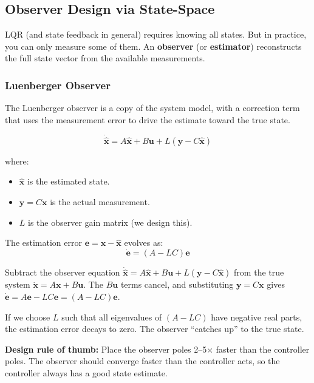 \subsection{Observer Design via State-Space}

LQR (and state feedback in general) requires knowing all states. But in practice, you can only measure some of them. An \textbf{observer} (or \textbf{estimator}) reconstructs the full state vector from the available measurements.

\subsubsection{Luenberger Observer}

The Luenberger observer is a copy of the system model, with a correction term that uses the measurement error to drive the estimate toward the true state.

\begin{equation}
\dot{\hat{\mathbf{x}}} = A\hat{\mathbf{x}} + B\mathbf{u} + L(\mathbf{y} - C\hat{\mathbf{x}})
\end{equation}

where:
\begin{itemize}[nosep]
    \item $\hat{\mathbf{x}}$ is the estimated state.
    \item $\mathbf{y} = C\mathbf{x}$ is the actual measurement.
    \item $L$ is the observer gain matrix (we design this).
\end{itemize}

The estimation error $\mathbf{e} = \mathbf{x} - \hat{\mathbf{x}}$ evolves as:
\begin{equation}
\dot{\mathbf{e}} = (A - LC)\mathbf{e}
\end{equation}

Subtract the observer equation $\dot{\hat{\mathbf{x}}} = A\hat{\mathbf{x}} + B\mathbf{u} + L(\mathbf{y} - C\hat{\mathbf{x}})$ from the true system $\dot{\mathbf{x}} = A\mathbf{x} + B\mathbf{u}$. The $B\mathbf{u}$ terms cancel, and substituting $\mathbf{y} = C\mathbf{x}$ gives $\dot{\mathbf{e}} = A\mathbf{e} - LC\mathbf{e} = (A - LC)\mathbf{e}$.

If we choose $L$ such that all eigenvalues of $(A - LC)$ have negative real parts, the estimation error decays to zero. The observer ``catches up'' to the true state.

\textbf{Design rule of thumb:} Place the observer poles 2--5$\times$ faster than the controller poles. The observer should converge faster than the controller acts, so the controller always has a good state estimate.

